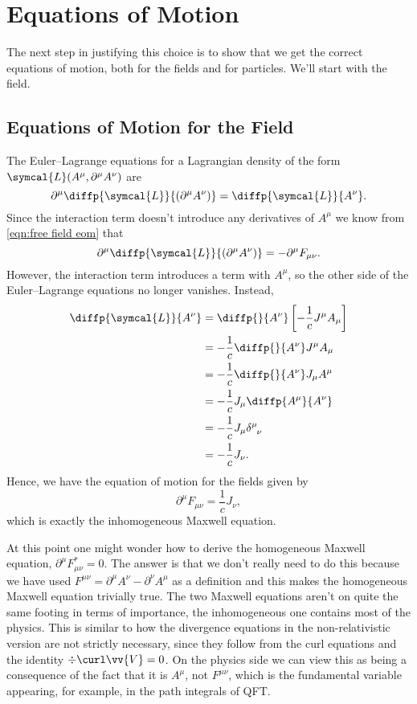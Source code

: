 \documentclass[fleqn]{NotesClass}
\newcommand*{\lagrangianDensity}{\symcal{L}}
\begin{document}
    \section{Equations of Motion}
    The next step in justifying this choice is to show that we get the correct equations of motion, both for the fields and for particles.
    We'll start with the field.
    
    \subsection{Equations of Motion for the Field}
    The Euler--Lagrange equations for a Lagrangian density of the form \(\lagrangianDensity(A^\mu, \partial^\mu A^\nu)\) are
    \begin{equation}
        \partial^\mu \diffp{\lagrangianDensity}{(\partial^\mu A^\nu)} = \diffp{\lagrangianDensity}{A^\nu}.
    \end{equation}
    Since the interaction term doesn't introduce any derivatives of \(A^\mu\) we know from \cref{eqn:free field eom} that
    \begin{equation}
        \partial^\mu \diffp{\lagrangianDensity}{(\partial^\mu A^\nu)} = -\partial^\mu F_{\mu\nu}.
    \end{equation}
    However, the interaction term introduces a term with \(A^\mu\), so the other side of the Euler--Lagrange equations no longer vanishes.
    Instead,
    \begin{align}
        \diffp{\lagrangianDensity}{A^\nu} &= \diffp{}{A^\nu} \left[ -\frac{1}{c}J^\mu A_\mu \right]\\
        &= -\frac{1}{c}\diffp{}{A^\nu} J^\mu A_\mu\\
        &= -\frac{1}{c}\diffp{}{A^\nu} J_\mu A^\mu\\
        &= -\frac{1}{c}J_\mu \diffp{A^\mu}{A^\nu}\\
        &= -\frac{1}{c}J_\mu \tensor{\delta}{^\mu_\nu}\\
        &= -\frac{1}{c}J_\nu.
    \end{align}
    Hence, we have the equation of motion for the fields given by
    \begin{equation}
        \partial^\mu F_{\mu\nu} = \frac{1}{c}J_\nu,
    \end{equation}
    which is exactly the inhomogeneous Maxwell equation.
    
    At this point one might wonder how to derive the homogeneous Maxwell equation, \(\partial^\mu F^*_{\mu\nu} = 0\).
    The answer is that we don't really need to do this because we have used \(F^{\mu\nu} = \partial^\mu A^\nu - \partial^\nu A^\mu\) as a definition and this makes the homogeneous Maxwell equation trivially true.
    The two Maxwell equations aren't on quite the same footing in terms of importance, the inhomogeneous one contains most of the physics.
    This is similar to how the divergence equations in the non-relativistic version are not strictly necessary, since they follow from the curl equations and the identity \(\div\curl\vv{V} = 0\).
    On the physics side we can view this as being a consequence of the fact that it is \(A^\mu\), not \(F^{\mu\nu}\), which is the fundamental variable appearing, for example, in the path integrals of QFT.
    
\end{document}
